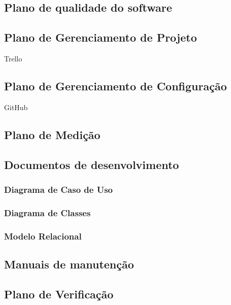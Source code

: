 \subsection{Plano de qualidade do software}

\subsection{Plano de Gerenciamento de Projeto}

Trello

\subsection{Plano de Gerenciamento de Configuração}

GitHub

\subsection{Plano de Medição}

\subsection{Documentos de desenvolvimento}

\subsubsection{Diagrama de Caso de Uso}

\subsubsection{Diagrama de Classes}

\subsubsection{Modelo Relacional} 

\subsection{Manuais de manutenção}

\subsection{Plano de Verificação}

